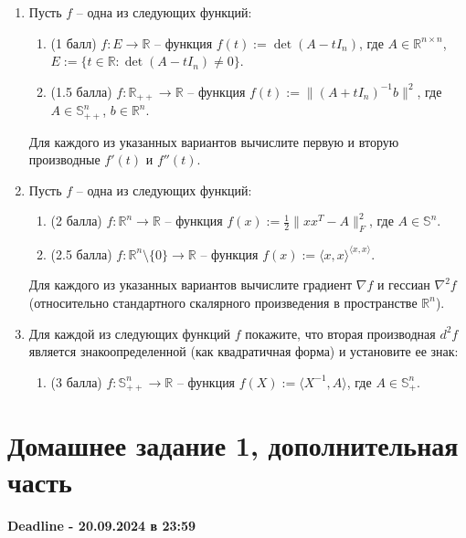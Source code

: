 \documentclass[a5paper,twoside,russian,8pt]{article}
\def  \R {\mathbb R}
\newcommand{\St}{\mathbb{S}}
\begin{document}
\begin{enumerate}[label=\textbf{Задача \arabic*.}]

    \item Пусть $f$ -- одна из следующих функций:
    \begin{enumerate}
        \item (1 балл) $f : E \to \R$ -- функция $f(t) := \det(A - t I_n)$, где $A \in \R^{n \times n}$, $E := \{ t \in \R : \det(A - t I_n) \neq 0 \}$.
        \item (1.5 балла) $f : \R_{++} \to \R$ -- функция $f(t) := \| (A + t I_n)^{-1} b \|^2$, где $A \in \St^n_{++}$, $b \in \R^n$.
    \end{enumerate}
    Для каждого из указанных вариантов вычислите первую и вторую производные $f'(t)$ и $f''(t)$.

    \item Пусть $f$ -- одна из следующих функций:
    \begin{enumerate}
        \item (2 балла) $f : \R^n \to \R$ -- функция $\displaystyle f(x) := \frac{1}{2} \| x x^T - A \|_F^2$, где $A \in \St^n$.
        \item (2.5 балла) $f : \R^n \setminus \{ 0 \} \to \R$ -- функция $\displaystyle f(x) := \langle x, x \rangle^{\langle x, x \rangle}$.
    \end{enumerate}
    Для каждого из указанных вариантов вычислите градиент $\nabla f$ и гессиан $\nabla^2 f$ (относительно стандартного скалярного произведения в пространстве $\R^n$).

    \item Для каждой из следующих функций $f$ покажите, что вторая производная $d^2 f$ является знакоопределенной (как квадратичная форма) и установите ее знак:
    \begin{enumerate}
        \item (3 балла) $f : \St^n_{++} \to \R$ -- функция $f(X) := \langle X^{-1}, A \rangle$, где $A \in \St^n_+$.
    \end{enumerate}
        
\end{enumerate}


\section{Домашнее задание 1, дополнительная часть}

\begin{center}
    \textbf{Deadline - 20.09.2024 в 23:59}
\end{center}
\end{document}
